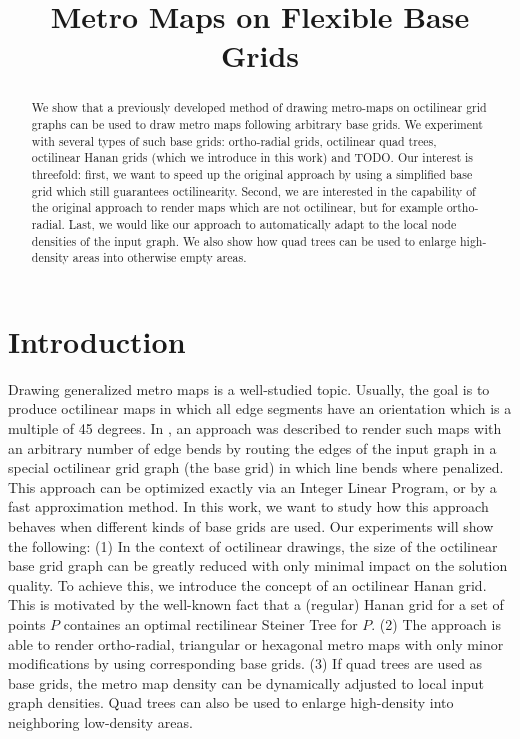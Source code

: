 \documentclass[sigconf]{acmart}
\begin{document}
\title{Metro Maps on Flexible Base Grids}

\begin{abstract}
We show that a previously developed method of drawing metro-maps on octilinear grid graphs can be used to draw metro maps following arbitrary base grids.
We experiment with several types of such base grids: ortho-radial grids, octilinear quad trees, octilinear Hanan grids (which we introduce in this work) and TODO.
Our interest is threefold:
first, we want to speed up the original approach by using a simplified base grid which still guarantees octilinearity.
Second, we are interested in the capability of the original approach to render maps which are not octilinear, but for example ortho-radial.
Last, we would like our approach to automatically adapt to the local node densities of the input graph.
We also show how quad trees can be used to enlarge high-density areas into otherwise empty areas.
\end{abstract}

\maketitle

\section{Introduction}

Drawing generalized metro maps is a well-studied topic.
Usually, the goal is to produce octilinear maps in which all edge segments have an orientation which is a multiple of 45 degrees.
In \cite{TODO}, an approach was described to render such maps with an arbitrary number of edge bends by routing the edges of the input graph in a special octilinear grid graph (the base grid) in which line bends where penalized.
This approach can be optimized exactly via an Integer Linear Program, or by a fast approximation method.
In this work, we want to study how this approach behaves when different kinds of base grids are used.
Our experiments will show the following:
(1) In the context of octilinear drawings, the size of the octilinear base grid graph can be greatly reduced with only minimal impact on the solution quality. To achieve this, we introduce the concept of an octilinear Hanan grid.
This is motivated by the well-known fact that a (regular) Hanan grid for a set of points $P$ containes an optimal rectilinear Steiner Tree for $P$.
(2) The approach is able to render ortho-radial, triangular or hexagonal metro maps with only minor modifications by using corresponding base grids.
(3) If quad trees are used as base grids, the metro map density can be dynamically adjusted to local input graph densities. Quad trees can also be used to enlarge high-density into neighboring low-density areas.
\end{document}
